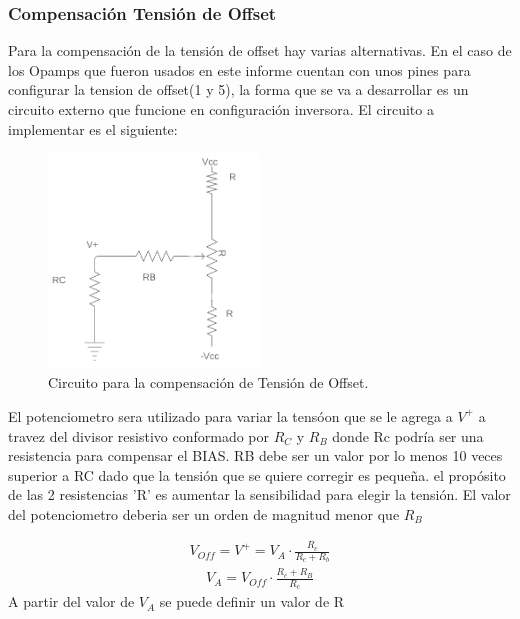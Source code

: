 \subsubsection{Compensación Tensión de Offset}
Para la compensación de la tensión de offset hay varias alternativas. En el caso de los Opamps que fueron usados en este informe cuentan con unos pines para configurar la tension de offset(1 y 5), la forma que se va a desarrollar es un circuito externo que funcione en configuración inversora.
El circuito a implementar es el siguiente:
\begin{figure}[H]	
	\centering
	\includegraphics[width=0.5\textwidth]{imagenes/CompensacionOff.PNG}
	\caption{Circuito para la compensación de Tensión de Offset.}
	\label{fig:CompensacionOff}
\end{figure}
El potenciometro sera utilizado para variar la tensóon que se le agrega a $V^+$ a travez del divisor resistivo conformado por $R_C$ y $R_B$ donde Rc podría ser una resistencia para compensar el BIAS. RB debe ser un valor por lo menos 10 veces superior a RC dado que la tensión que se quiere corregir es pequeña. el propósito de las 2 resistencias 'R' es aumentar la sensibilidad para elegir la tensión. El valor del potenciometro deberia ser un orden de magnitud menor que $R_B $

\begin{align}
V_{Off}=V^+ = V_A \cdot \frac{R_c}{R_c+R_b}  
\end{align}
\begin{align}
V_A =V_{Off} \cdot \frac{R_c+R_B}{R_c}
\end{align}
A partir del valor de $V_A$ se puede definir un valor de R
